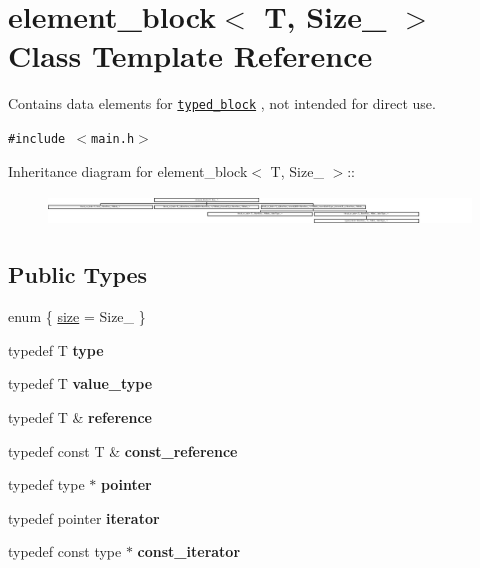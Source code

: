 \hypertarget{classelement__block}{
\section{element\_\-block$<$ T, Size\_\- $>$ Class Template Reference}
\label{classelement__block}
}
Contains data elements for {\tt \hyperlink{classtyped__block}{typed\_\-block}} , not intended for direct use.  


{\tt \#include $<$main.h$>$}

Inheritance diagram for element\_\-block$<$ T, Size\_\- $>$::\begin{figure}[H]
\begin{center}
\leavevmode
\includegraphics[height=0.824742cm]{classelement__block}
\end{center}
\end{figure}
\subsection*{Public Types}
\begin{CompactItemize}
\item 
enum \{ \hyperlink{group__mnglayer_gg2c6c9f26f6ba7bd45841bb125b90e04f5fdb4b66f1c64a4b69f23756713341f2}{size} =  Size\_\-
 \}
\item 
\hypertarget{classelement__block_0f3e4d93c44656acb473cde14318bacc}{
typedef T \textbf{type}}
\label{classelement__block_0f3e4d93c44656acb473cde14318bacc}

\item 
\hypertarget{group__mnglayer_gf4b942e8fd7f45f98e878658dd9d5eb3}{
typedef T \textbf{value\_\-type}}
\label{group__mnglayer_gf4b942e8fd7f45f98e878658dd9d5eb3}

\item 
\hypertarget{group__mnglayer_g440dde951fbd48acb83efcb7eb146fb7}{
typedef T \& \textbf{reference}}
\label{group__mnglayer_g440dde951fbd48acb83efcb7eb146fb7}

\item 
\hypertarget{group__mnglayer_gf5d43971860fb25f4cd591fe678bfc41}{
typedef const T \& \textbf{const\_\-reference}}
\label{group__mnglayer_gf5d43971860fb25f4cd591fe678bfc41}

\item 
\hypertarget{group__mnglayer_g0a2a1c6bc4bdad79df97c4fea68524b8}{
typedef type $\ast$ \textbf{pointer}}
\label{group__mnglayer_g0a2a1c6bc4bdad79df97c4fea68524b8}

\item 
\hypertarget{group__mnglayer_gc468b1fa2d879f091debc2d9fe0b329e}{
typedef pointer \textbf{iterator}}
\label{group__mnglayer_gc468b1fa2d879f091debc2d9fe0b329e}

\item 
\hypertarget{group__mnglayer_g0e51dca212a92bf8fe8f0ab48d93e915}{
typedef const type $\ast$ \textbf{const\_\-iterator}}
\label{group__mnglayer_g0e51dca212a92bf8fe8f0ab48d93e915}

\end{CompactItemize}
